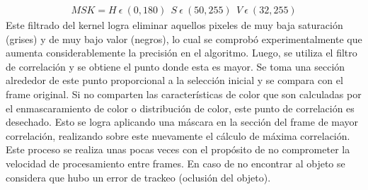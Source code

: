 \begin{align}
MSK = H \  \epsilon \ (0,180 ) \ \ S \  \epsilon \ (50,255) \ \ V \ \epsilon \ (32,255)
\end{align}
Este filtrado del kernel logra eliminar aquellos pixeles de muy baja saturación (grises) y de muy bajo valor (negros), lo cual se comprobó experimentalmente que aumenta considerablemente la precisión en el algoritmo.
Luego, se utiliza el filtro de correlación y se obtiene el punto donde esta es mayor. Se toma una sección alrededor de este punto proporcional a la selección inicial y se compara con el frame original. Si no comparten las características de color que son calculadas por el enmascaramiento de color o distribución de color, este punto de correlación es desechado. Esto se logra aplicando una máscara en la sección del frame de mayor correlación, realizando sobre este nuevamente el cálculo de máxima correlación. Este proceso se realiza unas pocas veces con el propósito de no comprometer la velocidad de procesamiento entre frames. En caso de no encontrar al objeto se considera que hubo un error de trackeo (oclusión del objeto).\\

